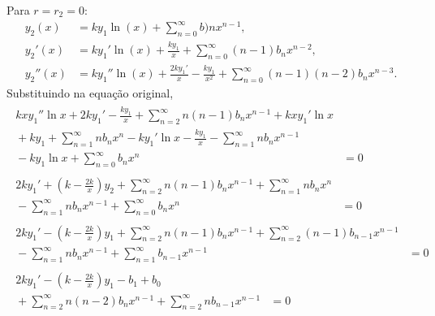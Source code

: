 \documentclass[a4paper,12pt, leqno, answers]{exam}
\begin{document}
\begin{questions}
\begin{solution}
        Para $r = r_2 = 0$:
        \begin{align*}
            y_2(x) &= k y_1 \ln \left( x \right) + \sum_{n = 0}^\infty b)n x^{n - 1}, \\
            y_2'(x) &= k y_1' \ln \left( x \right) + \frac{k y_1}{x} + \sum_{n = 0}^\infty \left( n - 1 \right) b_n x^{n - 2}, \\
            y_2''(x) &= k y_1'' \ln \left( x \right) + \frac{2 k y_1'}{x} - \frac{k y_1}{x^2} + \sum_{n = 0}^\infty \left( n - 1 \right) \left( n - 2 \right) b_n x^{n - 3}.
        \end{align*}
        Substituindo na equa\c{c}\~{a}o original,
        \begin{align*}
            \begin{split}
                k x y_1'' \ln x + 2 k y_1' - \frac{k y_1}{x} + \sum_{n = 2}^\infty n \left( n - 1 \right) b_n x^{n - 1} + k x y_1' \ln x \\ {}+ k y_1 + \sum_{n = 1}^\infty n b_n x^n - k y_1' \ln x - \frac{k y_1}{x} - \sum_{n = 1}^\infty n b_n x^{n - 1} \\ {}- k y_1 \ln x + \sum_{n = 0}^\infty b_n x^n &= 0
            \end{split} \\
            \begin{split}
                2 k y_1' + \left( k - \frac{2 k}{x} \right) y_2 + \sum_{n = 2}^\infty n \left( n - 1 \right) b_n x^{n - 1} + \sum_{n = 1}^\infty n b_n x^{n} \\ {}- \sum_{n = 1}^\infty n b_n x^{n - 1} + \sum_{n = 0}^\infty b_n x^{n} &= 0
            \end{split} \\
            \begin{split}
                2 k y_1' - \left( k - \frac{2 k}{x} \right) y_1 + \sum_{n = 2}^\infty n \left( n - 1 \right) b_n x^{n - 1} + \sum_{n = 2}^\infty \left( n - 1 \right) b_{n - 1} x^{n - 1} \\ {}- \sum_{n = 1}^\infty n b_n x^{n - 1} + \sum_{n = 1}^\infty b_{n - 1} x^{n - 1} &= 0
            \end{split} \\
            \begin{split}
                2 k y_1' - \left( k - \frac{2 k}{x} \right) y_1 - b_1 + b_0 \\ {}+ \sum_{n = 2}^\infty n \left( n - 2 \right) b_n x^{n - 1} + \sum_{n = 2}^\infty n b_{n - 1} x^{n - 1} &= 0
            \end{split} \\

\end{align*}
\end{solution}
\end{questions}
\end{document}
